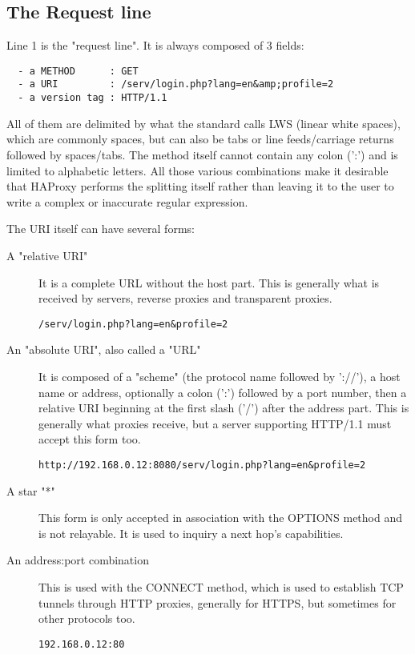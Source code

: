 \subsection{The Request line}
Line 1 is the "request line". It is always composed of 3 fields:
\begin{verbatim}
  - a METHOD      : GET
  - a URI         : /serv/login.php?lang=en&amp;profile=2
  - a version tag : HTTP/1.1
\end{verbatim}

All of them are delimited by what the standard calls LWS (linear white spaces),
which are commonly spaces, but can also be tabs or line feeds/carriage returns
followed by spaces/tabs. The method itself cannot contain any colon (':') and
is limited to alphabetic letters. All those various combinations make it
desirable that HAProxy performs the splitting itself rather than leaving it to
the user to write a complex or inaccurate regular expression.

The URI itself can have several forms:

\begin{description}
\item[A "relative URI"]
    It is a complete URL without the host part. This is generally what is
    received by servers, reverse proxies and transparent proxies.
    
    \verb|/serv/login.php?lang=en&profile=2|

\item[An "absolute URI", also called a "URL"]
    It is composed of a "scheme" (the protocol name followed by '://'), a host
    name or address, optionally a colon (':') followed by a port number, then
    a relative URI beginning at the first slash ('/') after the address part.
    This is generally what proxies receive, but a server supporting HTTP/1.1
    must accept this form too.
    
    \verb|http://192.168.0.12:8080/serv/login.php?lang=en&profile=2|

\item[A star "*"]
    This form is only accepted in association with the OPTIONS
    method and is not relayable. It is used to inquiry a next hop's
    capabilities.

\item[An address:port combination]
    This is used with the CONNECT method, which is used to establish TCP
    tunnels through HTTP proxies, generally for HTTPS, but sometimes for
    other protocols too.
    
    \verb|192.168.0.12:80|
\end{description}

